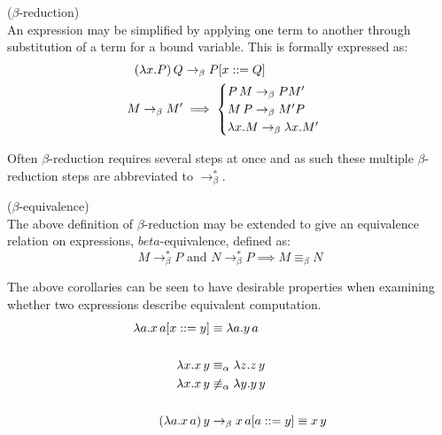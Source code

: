     \begin{definition}{($\beta$-reduction)\\}
        An expression may be simplified by applying one term to another through substitution of a term for a bound variable.
        This is formally expressed as:
        \begin{align}
            (\lambda x . P) \, Q   & \rightarrow_\beta P[x ::= Q] \\
            M \rightarrow_\beta M' & \implies
                \begin{cases}
                    P \, M \rightarrow_\beta P M' \\
                    M \, P \rightarrow_\beta M' P \\
                    \lambda x . M \rightarrow_\beta \lambda x . M'
                \end{cases}
        \end{align}
    \end{definition}
    Often $\beta$-reduction requires several steps at once and as such these multiple $\beta$-reduction steps are abbreviated to $\rightarrow_\beta^*$.

    \begin{corollary*}{($\beta$-equivalence)\\}
        The above definition of $\beta$-reduction may be extended to give an equivalence relation on expressions, $beta$-equivalence, defined as:
        \begin{equation}
            M \rightarrow_\beta^* P \text{ and } N \rightarrow_\beta^* P \implies M \equiv_\beta N
        \end{equation}
    \end{corollary*}
    

    \begin{example*}
        The above corollaries can be seen to have desirable properties when examining whether two expressions describe equivalent computation.
        \begin{align*}
            \lambda a . x \, a [x ::= y] & \equiv \lambda a . y \, a \\
            \\
            \lambda x . x \, y & \equiv_\alpha \lambda z . z \, y \\
            \lambda x . x \, y & \not\equiv_\alpha \lambda y . y \, y \\
            \\
            (\lambda a . x \, a) \, y & \rightarrow_\beta x \, a [a ::= y] \equiv x \, y
        \end{align*}
    \end{example*}


